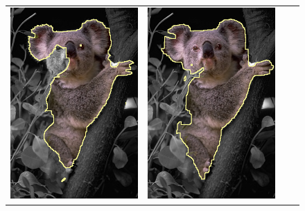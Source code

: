 {\begin{figure}
\begin{tabular}{cccc}
 	\includegraphics[scale=0.25]{figures/chapter6/segmentation/coala/mt_improve/radius_5/data_0.50/sq_0.00/length_0.50/it_50/gc-seg.png} & 
 	\includegraphics[scale=0.25]{figures/chapter6/segmentation/coala/mt_improve/radius_5/data_0.50/sq_0.00/length_0.50/it_50/corrected-seg.png} & 

\end{tabular}
\end{figure}}
